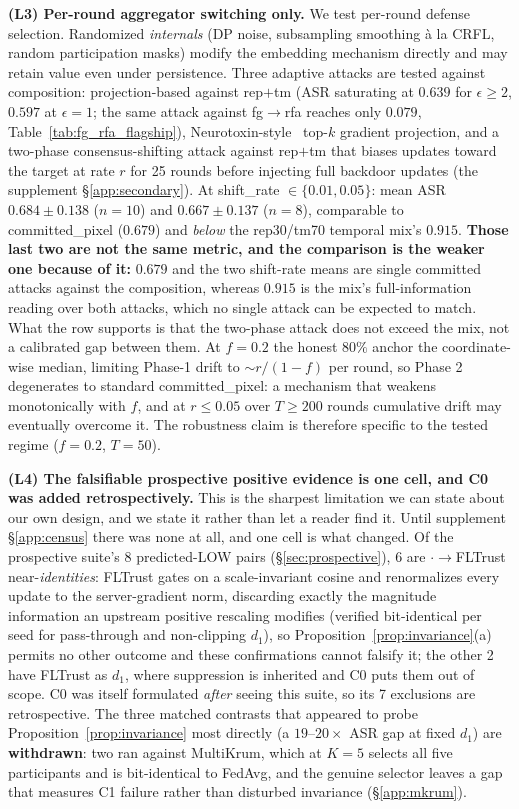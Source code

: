 \documentclass{article}
\begin{document}
\textbf{(L3) Per-round aggregator switching only.} We test per-round defense selection. Randomized \emph{internals} (DP noise, subsampling smoothing à la CRFL, random participation masks) modify the embedding mechanism directly and may retain value even under persistence. Three adaptive attacks are tested against composition: projection-based against rep$+$tm (ASR saturating at $0.639$ for $\epsilon \geq 2$, $0.597$ at $\epsilon{=}1$; the same attack against fg$\to$rfa reaches only $0.079$, Table~\ref{tab:fg_rfa_flagship}), Neurotoxin-style~\citep{zhang2022neurotoxin} top-$k$ gradient projection, and a two-phase consensus-shifting attack against rep$+$tm that biases updates toward the target at rate $r$ for 25 rounds before injecting full backdoor updates (the supplement §\ref{app:secondary}). At shift\_rate $\in \{0.01,0.05\}$: mean ASR $0.684 \pm 0.138$ ($n{=}10$) and $0.667 \pm 0.137$ ($n{=}8$), comparable to committed\_pixel ($0.679$) and \emph{below} the rep30/tm70 temporal mix's $0.915$. \textbf{Those last two are not the same metric, and the comparison is the weaker one because of it:} $0.679$ and the two shift-rate means are single committed attacks against the composition, whereas $0.915$ is the mix's full-information reading over both attacks, which no single attack can be expected to match. What the row supports is that the two-phase attack does not exceed the mix, not a calibrated gap between them. At $f{=}0.2$ the honest $80\%$ anchor the coordinate-wise median, limiting Phase-1 drift to ${\sim}r/(1{-}f)$ per round, so Phase 2 degenerates to standard committed\_pixel: a mechanism that weakens monotonically with $f$, and at $r \leq 0.05$ over $T \geq 200$ rounds cumulative drift may eventually overcome it. The robustness claim is therefore specific to the tested regime ($f{=}0.2$, $T{=}50$).

\textbf{(L4) The falsifiable prospective positive evidence is one cell, and C0 was added retrospectively.} This is the sharpest limitation we can state about our own design, and we state it rather than let a reader find it. Until supplement §\ref{app:census} there was none at all, and one cell is what changed. Of the prospective suite's 8 predicted-LOW pairs (§\ref{sec:prospective}), 6 are $\cdot{\to}$FLTrust near-\emph{identities}: FLTrust gates on a scale-invariant cosine and renormalizes every update to the server-gradient norm, discarding exactly the magnitude information an upstream positive rescaling modifies (verified bit-identical per seed for pass-through and non-clipping $d_1$), so Proposition~\ref{prop:invariance}(a) permits no other outcome and these confirmations cannot falsify it; the other 2 have FLTrust as $d_1$, where suppression is inherited and C0 puts them out of scope. C0 was itself formulated \emph{after} seeing this suite, so its 7 exclusions are retrospective. The three matched contrasts that appeared to probe Proposition~\ref{prop:invariance} most directly (a $19$--$20\times$ ASR gap at fixed $d_1$) are \textbf{withdrawn}: two ran against MultiKrum, which at $K{=}5$ selects all five participants and is bit-identical to FedAvg, and the genuine selector leaves a gap that measures C1 failure rather than disturbed invariance (§\ref{app:mkrum}).
\end{document}
